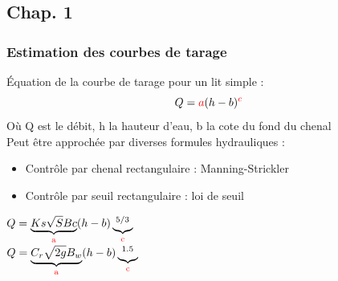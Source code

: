 \documentclass[compress,9pt]{beamer}
\begin{document}
	\subsection{Chap. 1}
	\begin{frame}
    	\frametitle{Estimation des courbes de tarage}
    		Équation de la courbe de tarage pour un lit simple : 
    		\begin{equation}
    			Q = \textcolor{red}{a}(h-b)^{\textcolor{red}c}
    		\end{equation}
    		Où Q est le débit, h la hauteur d'eau, b la cote du fond du chenal \\
		\vspace{1cm}
		Peut être approchée par diverses formules hydrauliques :
		\vfill
		\begin{minipage}{.4\textwidth}
			\begin{itemize}
				\item<2->[$\vartriangleright$] Contrôle par chenal rectangulaire : Manning-Strickler\\
				\vspace{0.5cm}
				\item<3->[$\vartriangleright$] Contrôle par seuil rectangulaire : loi de seuil
			\end{itemize}
		\end{minipage}
		\begin{minipage}{.55\textwidth}
			\begin{center}
%				
				 $Q = \underbrace{Ks\sqrt{S}Bc}_{\mathrm{\textcolor{red}{a}}}(h-b)\underbrace{^{5/3}}_{\mathrm{\textcolor{red}{c}}}$\\
				\vspace{0.5cm}
				\onslide<3-> $Q = \underbrace{C_r\sqrt{2g}B_w}_{\mathrm{\textcolor{red}{a}}}(h-b)\underbrace{^{1.5}}_{\mathrm{\textcolor{red}{c}}}$
			\end{center}
		\end{minipage}
    \end{frame}
    
\end{document}
